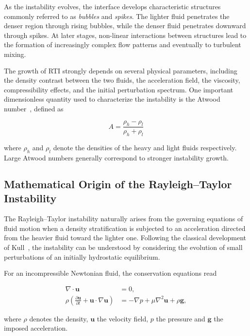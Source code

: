 As the instability evolves, the interface develops characteristic structures commonly referred to as \textit{bubbles} and \textit{spikes}. The lighter fluid penetrates the denser region through rising bubbles, while the denser fluid penetrates downward through spikes. At later stages, non-linear interactions between structures lead to the formation of increasingly complex flow patterns and eventually to turbulent mixing.

The growth of RTI strongly depends on several physical parameters, including the density contrast between the two fluids, the acceleration field, the viscosity, compressibility effects, and the initial perturbation spectrum. One important dimensionless quantity used to characterize the instability is the Atwood number~\citep[p.~22]{zhou2017rti1}, defined as

\begin{equation}
    A = \frac{\rho_h - \rho_l}{\rho_h + \rho_l}
\end{equation}

where $\rho_h$ and $\rho_l$ denote the densities of the heavy and light fluids respectively. Large Atwood numbers generally correspond to stronger instability growth.


\subsection{Mathematical Origin of the Rayleigh--Taylor Instability}

The Rayleigh--Taylor instability naturally arises from the governing equations of fluid motion when a density stratification is subjected to an acceleration directed from the heavier fluid toward the lighter one. Following the classical development of Kull~\cite{KULL1991197}, the instability can be understood by considering the evolution of small perturbations of an initially hydrostatic equilibrium.

For an incompressible Newtonian fluid, the conservation equations read

\begin{align}
\nabla\cdot\mathbf{u} &= 0,\\
\rho\left(
\frac{\partial\mathbf{u}}{\partial t}
+\mathbf{u}\cdot\nabla\mathbf{u}
\right)
&=
-\nabla p
+\mu\nabla^2\mathbf{u}
+\rho\mathbf{g},
\end{align}

where $\rho$ denotes the density, $\mathbf{u}$ the velocity field, $p$ the pressure and $\mathbf{g}$ the imposed acceleration.

